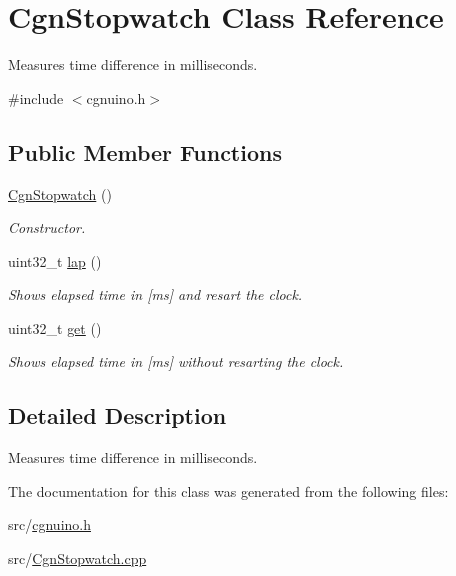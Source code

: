 \hypertarget{classCgnStopwatch}{}\section{Cgn\+Stopwatch Class Reference}
\label{classCgnStopwatch}


Measures time difference in milliseconds.  




{\ttfamily \#include $<$cgnuino.\+h$>$}

\subsection*{Public Member Functions}
\begin{DoxyCompactItemize}
\item 
\hyperlink{classCgnStopwatch_a114446066d6bfdf30e90081c8791eadf}{Cgn\+Stopwatch} ()\hypertarget{classCgnStopwatch_a114446066d6bfdf30e90081c8791eadf}{}\label{classCgnStopwatch_a114446066d6bfdf30e90081c8791eadf}

\begin{DoxyCompactList}\small\item\em Constructor. \end{DoxyCompactList}\item 
uint32\+\_\+t \hyperlink{classCgnStopwatch_a2efe7f5c956b63131426ac293d9eba89}{lap} ()\hypertarget{classCgnStopwatch_a2efe7f5c956b63131426ac293d9eba89}{}\label{classCgnStopwatch_a2efe7f5c956b63131426ac293d9eba89}

\begin{DoxyCompactList}\small\item\em Shows elapsed time in \mbox{[}ms\mbox{]} and resart the clock. \end{DoxyCompactList}\item 
uint32\+\_\+t \hyperlink{classCgnStopwatch_a87f3eb5cee29d4e622841df5b9f350b9}{get} ()\hypertarget{classCgnStopwatch_a87f3eb5cee29d4e622841df5b9f350b9}{}\label{classCgnStopwatch_a87f3eb5cee29d4e622841df5b9f350b9}

\begin{DoxyCompactList}\small\item\em Shows elapsed time in \mbox{[}ms\mbox{]} without resarting the clock. \end{DoxyCompactList}\end{DoxyCompactItemize}


\subsection{Detailed Description}
Measures time difference in milliseconds. 

The documentation for this class was generated from the following files\+:\begin{DoxyCompactItemize}
\item 
src/\hyperlink{cgnuino_8h}{cgnuino.\+h}\item 
src/\hyperlink{CgnStopwatch_8cpp}{Cgn\+Stopwatch.\+cpp}\end{DoxyCompactItemize}
